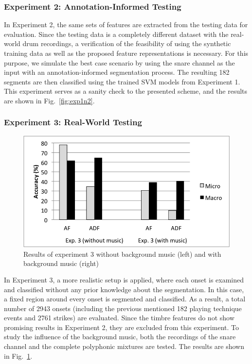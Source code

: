 \documentclass{article}
\begin{document}
{{{{{{{{{\subsubsection{Experiment 2: Annotation-Informed Testing}\label{sssec:exp2}
In Experiment 2, the same sets of features are extracted from the testing data for evaluation. Since the testing data is a completely different dataset with the real-world drum recordings, a verification of the feasibility of using the synthetic training data as well as the proposed feature representations is necessary. For this purpose, we simulate the best case scenario by using the snare channel as the input with an annotation-informed segmentation process. The resulting 182 segments are then classified using the trained SVM models from Experiment 1. This experiment serves as a sanity check to the presented scheme, and the results are shown in Fig.~\ref{fig:exp1n2}.

\subsubsection{Experiment 3: Real-World Testing}\label{sssec:exp3}
\begin{figure}
\centering
\includegraphics[width = 8.0 cm]{./figures/exp3.png}
\caption{Results of experiment 3 without background music (left) and with background music (right)}
\label{fig:exp3}
\end{figure}
In Experiment 3, a more realistic setup is applied, where each onset is examined and classified without any prior knowledge about the segmentation. In this case, a fixed region around every onset is segmented and classified. As a result, a total number of 2943 onsets (including the previous mentioned 182 playing technique events and 2761 strikes) are evaluated. Since the timbre features do not show promising results in Experiment 2, they are excluded from this experiment. To study the influence of the background music, both the recordings of the snare channel and the complete polyphonic mixtures are tested. The results are shown in Fig.~\ref{fig:exp3}.  

}}}}}}}}}
\end{document}
